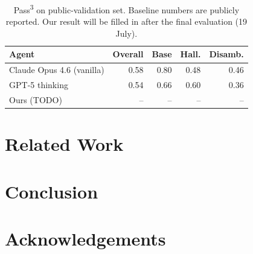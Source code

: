 \documentclass{article}
\begin{document}
\begin{table}[t]
\centering
\begin{tabular}{lrrrr}
\toprule
Agent & Overall & Base & Hall. & Disamb. \\
\midrule
Claude Opus 4.6 (vanilla) & 0.58 & 0.80 & 0.48 & 0.46 \\
GPT-5 thinking            & 0.54 & 0.66 & 0.60 & 0.36 \\
\midrule
Ours (TODO)               & --   & --   & --   & --   \\
\bottomrule
\end{tabular}
\caption{Pass\textsuperscript{3} on public-validation set.
         Baseline numbers are publicly reported.
         Our result will be filled in after the final evaluation (19 July).}
\label{tab:results}
\end{table}


\section{Related Work}


\section{Conclusion}

\section*{Acknowledgements}



\end{document}
